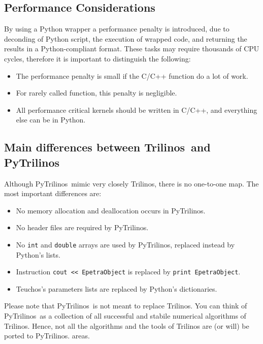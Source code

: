 \documentclass[10pt,relax]{SANDreport}
\newcommand{\PyTrilinos}{{PyTrilinos}}
\newcommand{\trilinos}{{Trilinos}}
\newcommand{\teuchos}{{Teuchos}}
\begin{document}
\subsection{Performance Considerations}
\label{sec:performance}

By using a Python wrapper a performance penalty is introduced, due to
deconding of Python script, the execution of wrapped code, and returning the
results in a Python-compliant format. These tasks may require thousands of CPU
cycles, therefore it is important to distinguish the following:
\begin{itemize}
\item The performance penalty is small if the C/C++ function do a lot of work.
\item For rarely called function, this penalty is negligible.
\item All performance critical kernels should be written in C/C++, and
everything else can be in Python.
\end{itemize}

\subsection{Main differences between \trilinos\ and \PyTrilinos}
\label{sec:differences}

Although \PyTrilinos\ mimic very closely \trilinos, there is no one-to-one
map. The most important differences are:
\begin{itemize}
\item No memory allocation and deallocation occurs in \PyTrilinos.
\item No header files are required by \PyTrilinos.
\item No {\tt int} and {\tt double} arrays are used by \PyTrilinos, replaced instead by
Python's lists.
\item Instruction \verb!cout << EpetraObject! is replaced by \verb!print EpetraObject!.
\item \teuchos's parameters lists are replaced by Python's dictionaries.
\end{itemize}

Please note that \PyTrilinos\ is not meant to replace Trilinos. You can think
of \PyTrilinos\ as a collection of all successful and stabile numerical
algorithms of Trilinos.  Hence, not all the algorithms and the tools of Trilinos are 
(or will) be ported to \PyTrilinos.  areas. 
\end{document}
